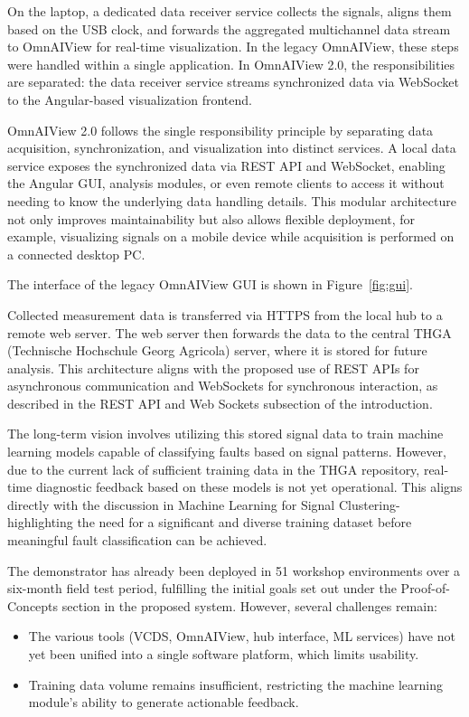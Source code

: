 On the laptop, a dedicated data receiver service collects the signals, aligns them based on the USB clock, and forwards the aggregated multichannel data stream to OmnAIView for real-time visualization. 
In the legacy OmnAIView, these steps were handled within a single application. In OmnAIView 2.0, the responsibilities are separated: the data receiver service streams synchronized data via WebSocket to the Angular-based visualization frontend.

OmnAIView 2.0 follows the single responsibility principle by separating data acquisition, synchronization, and visualization into distinct services. 
A local data service exposes the synchronized data via REST API and WebSocket, enabling the Angular GUI, analysis modules, or even remote clients to access it without needing to know the underlying data handling details. 
This modular architecture not only improves maintainability but also allows flexible deployment, for example, visualizing signals on a mobile device while acquisition is performed on a connected desktop PC.

The interface of the legacy OmnAIView GUI is shown in Figure~\ref{fig:gui}.

Collected measurement data is transferred via HTTPS from the local hub to a remote web server. 
The web server then forwards the data to the central THGA (Technische Hochschule Georg Agricola) server, where it is stored for future analysis. 
This architecture aligns with the proposed use of REST APIs for asynchronous communication and WebSockets for synchronous interaction, as described in the REST API and Web Sockets subsection of the introduction.

The long-term vision involves utilizing this stored signal data to train machine learning models capable of classifying faults based on signal patterns. 
However, due to the current lack of sufficient training data in the THGA repository, real-time diagnostic feedback based on these models is not yet operational. 
This aligns directly with the discussion in Machine Learning for Signal Clustering-highlighting the need for a significant and diverse training dataset before meaningful fault classification can be achieved.

The demonstrator has already been deployed in 51 workshop environments over a six-month field test period, 
fulfilling the initial goals set out under the Proof-of-Concepts section in the proposed system. 
However, several challenges remain:
\begin{itemize}
  \item The various tools (VCDS, OmnAIView, hub interface, ML services) have not yet been unified into a single software platform, which limits usability.
  \item Training data volume remains insufficient, restricting the machine learning module’s ability to generate actionable feedback.
\end{itemize}



